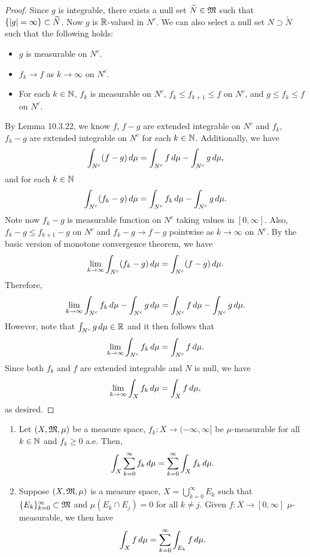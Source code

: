 \documentclass[a4paper]{article}
\renewcommand{\cupinfk}{\bigcup_{k=0}^\infty}
\renewcommand{\suminfk}{\sum_{k=0}^\infty}
\renewcommand{\seqinfk}[1]{\{ #1 \}_{k=0}^\infty}
\begin{document}
\begin{proof}
Since $g$ is integrable, there exists a null set $\widetilde{N} \in \mathfrak{M}$
such that $\left\{ \left\lvert g\right\rvert = \infty \right\} \subset \widetilde{N}$.
Now $g$ is $\mathbb{R}$-valued in $N^c$.
We can also select a null set $N \supset \tilde{N}$
such that the following holds:
\begin{itemize}
  \item $g$ is measurable on $N^c$.
  \item $f_k \to f$ as $k \to \infty$ on $N^c$.
  \item For each $k \in \mathbb{N}$, $f_k$ is measurable
  on $N^c$, $f_k \leq f_{k+1} \leq f$ on $N^c$, and
  $g \leq f_k \leq f$ on $N^c$.
\end{itemize}
By Lemma 10.3.22, we know $f$, $f - g$ are extended
integrable on $N^c$ and $f_k$, $f_k - g$ are extended integrable
on $N^c$ for each $k \in \mathbb{N}$. Additionally, we have
\[
\int_{N^c} (f - g) \, d \mu = \int_{N^c} f \, d \mu - \int_{N^c}
g \, d \mu,
\]
and for each $k \in \mathbb{N}$
\[
\int_{N^c} (f_k - g) \, d \mu = \int_{N^c} f_k \, d \mu
- \int_{N^c} g \, d \mu.
\]
Note now $f_k - g$ is measurable function on $N^c$
taking values in $[0, \infty]$. Also,
$f_k - g \leq f_{k+1} - g$ on $N^c$ and $f_k - g \to f - g$
pointwise as $k \to \infty$ on $N^c$. By the basic version
of monotone convergence theorem, we have
\[
\lim_{k \to \infty} \int_{N^c} (f_k - g) \, d \mu
= \int_{N^c} (f - g) \, d \mu.
\]
Therefore,
\[
\lim_{k \to \infty} \int_{N^c} f_k \, d \mu
- \int_{N^c} g \, d \mu = \int_{N^c} f \, d \mu
- \int_{N^c} g \, d \mu.
\]
However, note that $\int_{N^c} g \, d \mu \in \mathbb{R}$
and it then follows that
\[
\lim_{k \to \infty} \int_{N^c} f_k \, d \mu =
\int_{N^c} f \, d \mu.
\]
Since both $f_k$ and $f$ are extended integrable and
$N$ is null, we have
\[
\lim_{k \to \infty} \int_X f_k \, d \mu = \int_X f \, d \mu,
\]
as desired.

\end{proof}

\begin{cor}
\begin{enumerate}
  \item Let $(X, \mathfrak{M}, \mu)$ be a measure space, $f_k : X \to (-\infty, \infty]$
  be $\mu$-measurable for all $k \in \mathbb{N}$ and $f_k \geq 0$ a.e.
  Then,
  \[
  \int_X \suminfk f_k \d \mu = \suminfk \int_X f_k \d \mu.
  \]

  \item Suppose $(X, \mathfrak{M}, \mu)$ is a measure space, $X = \cupinfk E_k$
  such that $\seqinfk{E_k} \subset \mf$ and $\mu \left( E_k \cap E_j \right)
  = 0$ for all $k \neq j$. Given $f: X \to [0, \infty]$
  $\mu$-measurable, we then have
  \[
  \int_X f \d \mu = \suminfk \int_{E_k} f \d \mu.
  \]
\end{enumerate}
\end{cor}
\end{document}
